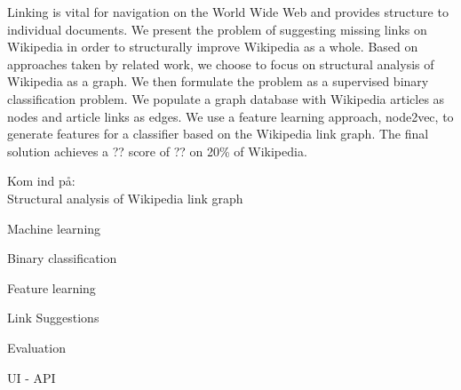 Linking is vital for navigation on the World Wide Web and provides structure to individual documents. We present the problem of suggesting missing links on Wikipedia in order to structurally improve Wikipedia as a whole. Based on approaches taken by related work, we choose to focus on structural analysis of Wikipedia as a graph. We then formulate the problem as a supervised binary classification problem. We populate a graph database with Wikipedia articles as nodes and article links as edges. We use a feature learning approach, node2vec, to generate features for a classifier based on the Wikipedia link graph. The final solution achieves a ?? score of ?? on 20\% of Wikipedia.


Kom ind på:\\
Structural analysis of Wikipedia link graph

Machine learning

Binary classification

Feature learning

Link Suggestions

Evaluation

UI - API